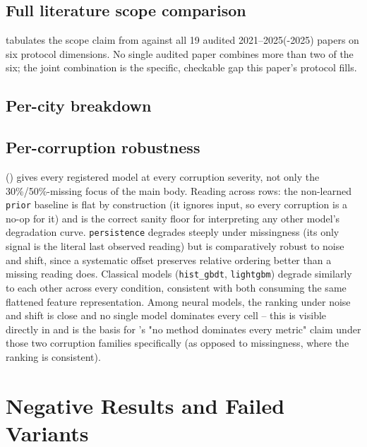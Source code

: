 \subsection{Full literature scope comparison}
\label{app:literature-scope}

 tabulates the scope claim from  against all 19
audited 2021--2025(-2025) papers on six protocol dimensions. No single audited paper combines
more than two of the six; the joint combination is the specific, checkable gap this paper's
protocol fills.



\subsection{Per-city breakdown}
\label{app:percity-detail}



\subsection{Per-corruption robustness}
\label{app:robustness-detail}

 () gives every registered model at every
corruption severity, not only the 30\%/50\%-missing focus of the main body. Reading across rows:
the non-learned \texttt{prior} baseline is flat by construction (it ignores input, so every
corruption is a no-op for it) and is the correct sanity floor for interpreting any other model's
degradation curve. \texttt{persistence} degrades steeply under missingness (its only signal is the
literal last observed reading) but is comparatively robust to noise and shift, since a systematic
offset preserves relative ordering better than a missing reading does. Classical models
(\texttt{hist\_gbdt}, \texttt{lightgbm}) degrade similarly to each other across every condition,
consistent with both consuming the same flattened feature representation. Among neural models,
the ranking under noise and shift is close and no single model dominates every cell -- this is
visible directly in  and is the basis for 's
"no method dominates every metric" claim under those two corruption families specifically (as
opposed to missingness, where the ranking is consistent).

\section{Negative Results and Failed Variants}
\label{app:negative}

